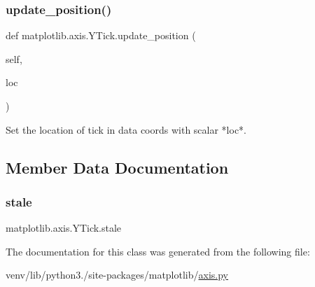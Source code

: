 \mbox{\label{classmatplotlib_1_1axis_1_1YTick_a72a8e2fcc51ff4fbc7a5dae9688cc78c}} 
\subsubsection{\texorpdfstring{update\+\_\+position()}{update\_position()}}
{\footnotesize\ttfamily def matplotlib.\+axis.\+Y\+Tick.\+update\+\_\+position (\begin{DoxyParamCaption}\item[{}]{self,  }\item[{}]{loc }\end{DoxyParamCaption})}

\begin{DoxyVerb}Set the location of tick in data coords with scalar *loc*.\end{DoxyVerb}
 

\subsection{Member Data Documentation}
\mbox{\label{classmatplotlib_1_1axis_1_1YTick_a0fe121f862ae76f2d9d81fed845e12e2}} 
\subsubsection{\texorpdfstring{stale}{stale}}
{\footnotesize\ttfamily matplotlib.\+axis.\+Y\+Tick.\+stale}



The documentation for this class was generated from the following file\+:\begin{DoxyCompactItemize}
\item 
venv/lib/python3./site-\/packages/matplotlib/\hyperlink{axis_8py}{axis.\+py}\end{DoxyCompactItemize}
